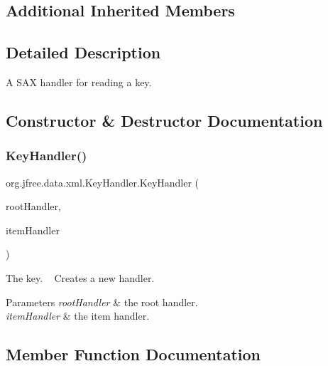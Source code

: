 \subsection*{Additional Inherited Members}


\subsection{Detailed Description}
A S\+AX handler for reading a key. 

\subsection{Constructor \& Destructor Documentation}
\mbox{\label{classorg_1_1jfree_1_1data_1_1xml_1_1_key_handler_a1a803f1b561bbccc5a9215d934c21aa4}} 
\subsubsection{\texorpdfstring{Key\+Handler()}{KeyHandler()}}
{\footnotesize\ttfamily org.\+jfree.\+data.\+xml.\+Key\+Handler.\+Key\+Handler (\begin{DoxyParamCaption}\item[{\mbox{\hyperlink{classorg_1_1jfree_1_1data_1_1xml_1_1_root_handler}{Root\+Handler}}}]{root\+Handler,  }\item[{\mbox{\hyperlink{classorg_1_1jfree_1_1data_1_1xml_1_1_item_handler}{Item\+Handler}}}]{item\+Handler }\end{DoxyParamCaption})}

The key. ~\newline
Creates a new handler.


\begin{DoxyParams}{Parameters}
{\em root\+Handler} & the root handler. \\
\hline
{\em item\+Handler} & the item handler. \\
\hline
\end{DoxyParams}


\subsection{Member Function Documentation}
\mbox{\label{classorg_1_1jfree_1_1data_1_1xml_1_1_key_handler_a0c5470a90a05a88d3cd6961c64881ada}} 

